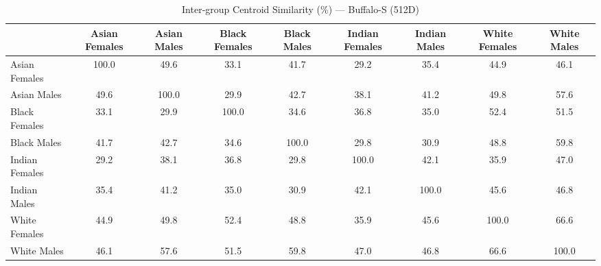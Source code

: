 \begin{table}[htbp]
\centering
\caption{Inter-group Centroid Similarity (\%) — Buffalo-S (512D)}
\label{tab:inter-if-buffalo-s}
\tiny
\begin{tabular}{lcccccccc}
\toprule
 & Asian Females & Asian Males & Black Females & Black Males & Indian Females & Indian Males & White Females & White Males \\
\midrule
Asian Females & 100.0 & 49.6 & 33.1 & 41.7 & 29.2 & 35.4 & 44.9 & 46.1 \\
Asian Males & 49.6 & 100.0 & 29.9 & 42.7 & 38.1 & 41.2 & 49.8 & 57.6 \\
Black Females & 33.1 & 29.9 & 100.0 & 34.6 & 36.8 & 35.0 & 52.4 & 51.5 \\
Black Males & 41.7 & 42.7 & 34.6 & 100.0 & 29.8 & 30.9 & 48.8 & 59.8 \\
Indian Females & 29.2 & 38.1 & 36.8 & 29.8 & 100.0 & 42.1 & 35.9 & 47.0 \\
Indian Males & 35.4 & 41.2 & 35.0 & 30.9 & 42.1 & 100.0 & 45.6 & 46.8 \\
White Females & 44.9 & 49.8 & 52.4 & 48.8 & 35.9 & 45.6 & 100.0 & 66.6 \\
White Males & 46.1 & 57.6 & 51.5 & 59.8 & 47.0 & 46.8 & 66.6 & 100.0 \\
\bottomrule
\end{tabular}
\end{table}
